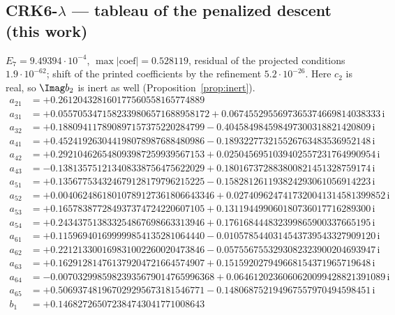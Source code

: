 \subsection*{CRK6-$\lambda$ --- tableau of the penalized descent (this work)}
$E_{7}=9.49394\cdot10^{-4}$, $\max|\text{coef}|=0.528119$, residual of the projected conditions $1.9\cdot10^{-62}$; shift of the printed coefficients by the refinement $5.2\cdot10^{-26}$. Here $c_2$ is real, so $\Imag b_2$ is inert as well (Proposition~\ref{prop:inert}).
{\small
\begin{align*}
a_{21} &= +0.261204328160177560558165774889\\
a_{31} &= +0.0557053471582339806571688958172 + 0.0674552955697365374669814038333\,\mathrm{i}\\
a_{32} &= +0.188094117890897157375220284799 - 0.404584984598497300318821420809\,\mathrm{i}\\
a_{41} &= +0.452419263044198078987688480986 - 0.189322773215526763483536952148\,\mathrm{i}\\
a_{42} &= +0.292104626548093987259939567153 + 0.0250456951039402557231764990954\,\mathrm{i}\\
a_{43} &= -0.138135751213408338756475622029 + 0.180167372883800821451328759174\,\mathrm{i}\\
a_{51} &= +0.135677534324679128179796215225 - 0.158281261193824293061056914223\,\mathrm{i}\\
a_{52} &= +0.00406248618010789127361806643346 + 0.0274096247417320041314581399852\,\mathrm{i}\\
a_{53} &= +0.165783877284937374724220607105 + 0.131194499060180736017716289300\,\mathrm{i}\\
a_{54} &= +0.243437513833254867698663313946 + 0.176168444832399865900337665195\,\mathrm{i}\\
a_{61} &= +0.115969401699999854135281064440 - 0.0105785440314543739543327909120\,\mathrm{i}\\
a_{62} &= +0.221213300169831002260020473846 - 0.0575567553293082323900204693947\,\mathrm{i}\\
a_{63} &= +0.162912814761379204721664574907 + 0.151592027949668154371965719648\,\mathrm{i}\\
a_{64} &= -0.00703299859823935679014765996368 + 0.0646120236060620099428821391089\,\mathrm{i}\\
a_{65} &= +0.506937481967029295673181546771 - 0.148068752194967557970494598451\,\mathrm{i}\\[1mm]
b_{1} &= +0.146827265072384743041771008643\\

\end{align*}}
